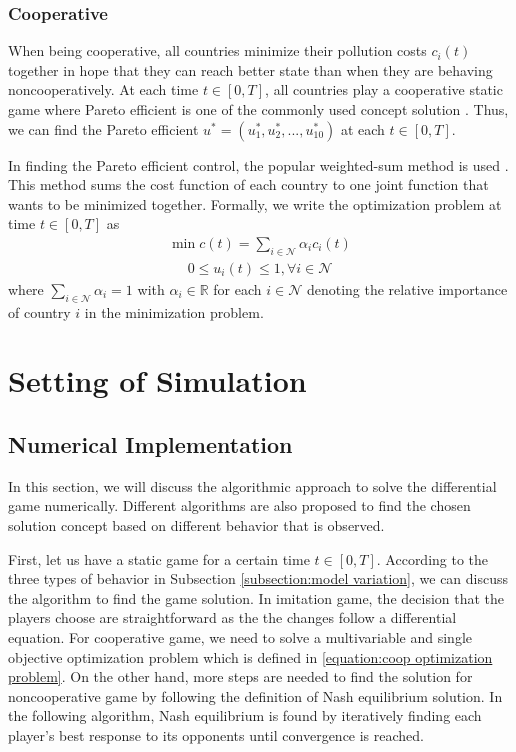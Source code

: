 \documentclass[a4paper,fleqn]{cas-dc}
\begin{document}
\subsubsection{Cooperative}

When being cooperative, all countries minimize their pollution costs $c_i(t)$ together in hope that they can reach better state than when they are behaving noncooperatively. At each time $t\in [0,T]$, all countries play a cooperative static game where Pareto efficient is one of the commonly used concept solution \citep{PositioningCGT}. Thus, we can find the Pareto efficient $u^*=(u_1^*,u_2^*,...,u_{10}^*)$ at each $t\in [0,T]$.

In finding the Pareto efficient control, the popular weighted-sum method is used \citep{PositioningCGT, YANG2014197}. This method sums the cost function of each country to one joint function that wants to be minimized together. Formally, we write the optimization problem at time $t\in[0,T]$ as
\begin{align} \label{equation:coop optimization problem}
    \min c(t) = \sum_{i\in\mathcal{N}}\alpha_i c_i(t)
\end{align}
\begin{align*}
    0 \leq u_i(t) \leq 1, \forall i\in\mathcal{N}
\end{align*}
where $\sum_{i\in\mathcal{N}}\alpha_i=1$ with $\alpha_i\in\mathbb{R}$ for each $i\in\mathcal{N}$ denoting the relative importance of country $i$ in the minimization problem.

\section{Setting of Simulation} \label{sec:simulations}

\subsection{Numerical Implementation}

In this section, we will discuss the algorithmic approach to solve the differential game numerically. Different algorithms are also proposed to find the chosen solution concept based on different behavior that is observed.

First, let us have a static game for a certain time $t\in[0,T]$. According to the three types of behavior in Subsection \ref{subsection:model variation}, we can discuss the algorithm to find the game solution. In imitation game, the decision that the players choose are straightforward as the the changes follow a differential equation. For cooperative game, we need to solve a multivariable and single objective optimization problem which is defined in \eqref{equation:coop optimization problem}. On the other hand, more steps are needed to find the solution for noncooperative game by following the definition of Nash equilibrium solution. In the following algorithm, Nash equilibrium is found by iteratively finding each player's best response to its opponents until convergence is reached.
\end{document}
